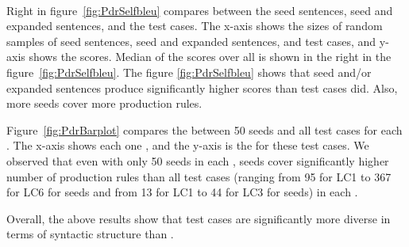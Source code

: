\paragraph*{\Pdr} Right in figure~\ref{fig:PdrSelfbleu} compares \pdr between the \tool seed sentences, \tool seed and expanded sentences, and the \Cklst test cases. The x-axis shows the sizes of random samples of \tool seed sentences, \tool seed and expanded sentences, and \Cklst test cases, and y-axis shows the \pdr scores. Median of the \pdr scores over all \lcs is shown in the right in the figure~\ref{fig:PdrSelfbleu}. The figure \ref{fig:PdrSelfbleu} shows that \tool seed and/or expanded sentences produce significantly higher \pdr scores than \Cklst test cases did. Also, more \tool seeds cover more production rules.

Figure~\ref{fig:PdrBarplot} compares the \pdr between 50 \tool seeds and all \Cklst test cases for each \lc. The x-axis shows each one \lc, and the y-axis is the \pdr for these test cases.
We observed that even with only 50 seeds in each \lc, \tool seeds cover significantly higher number of production rules than all \Cklst test cases (ranging from 95 for LC1 to 367 for LC6 for \tool seeds and from 13 for LC1 to 44 for LC3 for \Cklst seeds) in each \lc.

Overall, the above results show that \tool test cases are significantly more diverse in terms of syntactic structure than \Cklst.

